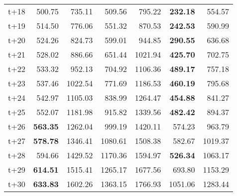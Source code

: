 \begin{table}[H]
\begin{tabular}{lrrrrrr}
t+18  & 500.75  & 735.11  & 509.56  & 795.22  & \textbf{232.18}  & 554.57  \\
t+19  & 514.50  & 776.06  & 551.32  & 870.53  & \textbf{242.53}  & 590.99  \\
t+20  & 524.26  & 824.73  & 599.01  & 944.85  & \textbf{290.55}  & 636.68  \\
t+21  & 528.02  & 886.66  & 651.44  & 1021.94  & \textbf{425.70}  & 702.75  \\
t+22  & 533.32  & 952.13  & 704.92  & 1106.36  & \textbf{489.17}  & 757.18  \\
t+23  & 537.46  & 1022.54  & 771.69  & 1186.53  & \textbf{460.19}  & 795.68  \\
t+24  & 542.97  & 1105.03  & 838.99  & 1264.47  & \textbf{454.88}  & 841.27  \\
t+25  & 552.07  & 1181.98  & 915.82  & 1339.56  & \textbf{482.42}  & 894.37  \\
t+26  & \textbf{563.35}  & 1262.04  & 999.19  & 1420.11  & 574.23  & 963.79  \\
t+27  & \textbf{578.78}  & 1346.41  & 1080.61  & 1508.38  & 582.67  & 1019.37  \\
t+28  & 594.66  & 1429.52  & 1170.36  & 1594.97  & \textbf{526.34}  & 1063.17  \\
t+29  & \textbf{614.51}  & 1515.41  & 1265.17  & 1677.56  & 693.80  & 1153.29  \\
t+30  & \textbf{633.83}  & 1602.26  & 1363.15  & 1766.93  & 1051.06  & 1283.44  \\

\bottomrule
\end{tabular}
\end{table}
